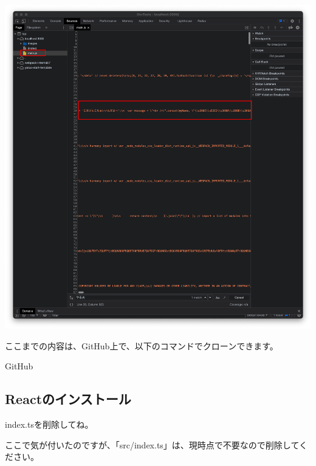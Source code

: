 \begin{reviewimage}%
\includegraphics[width=0.9\maxwidth]{./images/02-create-react-app/babel07.png}%
\label{image:02-create-react-app:babel07}
\end{reviewimage}
\begin{starternote}[]{}

ここまでの内容は、GitHub上で、以下のコマンドでクローンできます。

\def\startercodeblockfontsize{}
\begin{starterterminal}[]{GitHub}\end{starterterminal}
\end{starternote}

\subsection{Reactのインストール}
\keeplastskip{
  \label{sec:2-2-7}
  \label{sec04-react}
  \par\nobreak
}
\begin{starterwarning}{index.tsを削除してね。}

ここで気が付いたのですが、「src/index.ts」は、現時点で不要なので削除してください。

\end{starterwarning}

